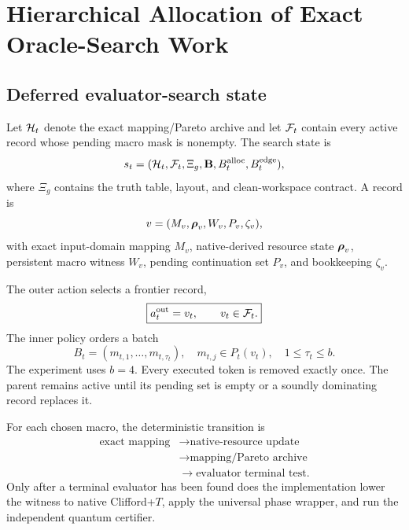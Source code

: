 \section{Hierarchical Allocation of Exact Oracle-Search Work}
\label{sec:hierarchical-control}

\subsection{Deferred evaluator-search state}

Let $\mathcal{H}_t$ denote the exact mapping/Pareto archive and let $\mathcal{F}_t$ contain every active record whose pending macro mask is nonempty.  The search state is
\begin{equation}
s_t=(\mathcal{H}_t,\mathcal{F}_t,\Xi_g,\mathbf{B},B_t^{\mathrm{alloc}},B_t^{\mathrm{edge}}),
\end{equation}
where $\Xi_g$ contains the truth table, layout, and clean-workspace contract.  A record is
\begin{equation}
v=(M_v,\boldsymbol{\rho}_v,W_v,P_v,\zeta_v),
\label{eq:oracle-record}
\end{equation}
with exact input-domain mapping $M_v$, native-derived resource state $\boldsymbol{\rho}_v$, persistent macro witness $W_v$, pending continuation set $P_v$, and bookkeeping $\zeta_v$.

The outer action selects a frontier record,
\begin{equation}
\boxed{a_t^{\mathrm{out}}=v_t,\qquad v_t\in\mathcal{F}_t.}
\label{eq:outer-action}
\end{equation}
The inner policy orders a batch
\begin{equation}
\boxed{
B_t=(m_{t,1},\ldots,m_{t,\tau_t}),
\quad m_{t,j}\in P_t(v_t),
\quad 1\leq\tau_t\leq b.
}
\label{eq:inner-batch}
\end{equation}
The experiment uses $b=4$.  Every executed token is removed exactly once.  The parent remains active until its pending set is empty or a soundly dominating record replaces it.

For each chosen macro, the deterministic transition is
\begin{equation}
\begin{aligned}
\text{exact mapping}
&\rightarrow \text{native-resource update}\\
&\rightarrow \text{mapping/Pareto archive}\\
&\rightarrow \text{evaluator terminal test}.
\end{aligned}
\label{eq:macro-exact-pipeline}
\end{equation}
Only after a terminal evaluator has been found does the implementation lower the witness to native Clifford+$T$, apply the universal phase wrapper, and run the independent quantum certifier.

